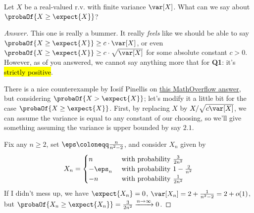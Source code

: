 \documentclass[10pt]{article}
\renewcommand{\eqdef}{\coloneqq}
\begin{document}
\begin{quest}
Let $X$ be a real-valued r.v. with finite variance $\var[X]$. What can we say about $\probaOf{X \geq \expect{X}}$?
\end{quest}
\begin{proof}[Answer]
This one is really a bummer. It really \emph{feels} like we should be able to say $\probaOf{X \geq \expect{X}} \geq c\cdot \var[X]$, or even $\probaOf{X \geq \expect{X}} \geq c\cdot \sqrt{\var[X]}$ for some absolute constant $c>0$. However, as  of you answered, we cannot say anything more that for \textbf{Q1}: it's \hl{strictly positive}.

There is a nice counterexample by Iosif Pinellis on \href{https://mathoverflow.net/a/358212/37266}{this MathOverflow answer}, but considering $\probaOf{X > \expect{X}}$; let's modify it a little bit for the case $\probaOf{X \geq \expect{X}}$. First, by replacing $X$ by $X/\sqrt{c\var[X]}$, we can assume the variance is equal to any constant of our choosing, so we'll give something assuming the variance is upper bounded by say $2.1$.\smallskip

\noindent Fix any $n\geq 2$, set $\eps \eqdef \frac{n}{n^2-2}$, and consider $X_n$ given by
\[
  X_n = \begin{cases}
      n & \text{ with probability } \frac{3}{2n^2}\\
      -\eps_n & \text{ with probability } 1-\frac{2}{n^2}\\
      -n & \text{ with probability } \frac{1}{2n^2}
    \end{cases}
\]
If I didn't mess up, we have $\expect{X_n}=0$, $\var[X_n] = 2+ \frac{1}{n^2-2} = 2+o(1)$, but \mbox{$\probaOf{X_n \geq \expect{X_n}} = \frac{3}{2n^2} \xrightarrow[]{n\to\infty} 0$.}
\end{proof}
\end{document}
